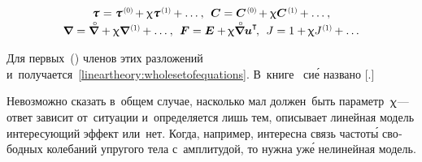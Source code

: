 \begin{otherlanguage}{russian}
\nopagebreak\vspace{-0.1em}\begin{equation*}
\begin{array}{c}
\cauchystress \hspace{.1ex} = \cauchystress^{\hspace{0.2ex}\scalebox{0.66}[0.66]{(0)}} \hspace{-0.2ex} + \smallparameter \cauchystress^{\hspace{0.2ex}\scalebox{0.66}[0.66]{(1)}} \hspace{-0.1ex} + \ldots \hspace{.1ex}, \:\:
\bm{C} = \bm{C}^{\hspace{0.2ex}\scalebox{0.66}[0.66]{(0)}} \hspace{-0.2ex} + \smallparameter \bm{C}^{\hspace{0.2ex}\scalebox{0.66}[0.66]{(1)}} \hspace{-0.1ex} + \ldots \hspace{.1ex} ,
\\[.1em]
\boldnabla \hspace{.1ex} = \boldnablacircled \hspace{.1ex} + \smallparameter \boldnabla^{\hspace{0.2ex}\scalebox{0.66}[0.66]{(1)}} \hspace{-0.1ex} + \ldots \hspace{.1ex} , \:\:
\bm{F} = \bm{E} + \hspace{-0.1ex} \smallparameter \boldnablacircled {\bm{u}}^{\T} \hspace{-0.3ex}, \:\:
J = 1 + \hspace{-0.1ex} \smallparameter J^{\hspace{.1ex}\scalebox{0.66}[0.66]{(1)}} \hspace{-0.1ex} + \ldots
\end{array}
\end{equation*}

\vspace{-0.1em}\noindent
Для первых~() членов этих разложений и~получается~\eqref{lineartheory:wholesetofequations}.
В~\hbox{книге~\cite{truesdell-firstcourse}} си\'{е} названо [.]

Невозможно сказать в~общем случае, насколько мал должен~быть параметр~$\upchi$\:--- ответ зависит от~ситуации и~определяется лишь тем, описывает линейная модель интересующий эффект или~нет.
Когда, например, интересна связь частот\'{ы} свободных колебаний упругого тела с~амплитудой, то нужна уж\'{е} нелинейная модель.


\end{otherlanguage}

